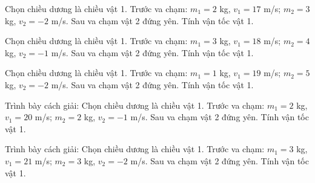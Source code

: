 \begin{ex}
Chọn chiều dương là chiều vật 1. Trước va chạm: $m_1=2$ kg, $v_1=17$ m/s; $m_2=3$ kg, $v_2=-2$ m/s. Sau va chạm vật 2 đứng yên. Tính vận tốc vật 1.
\end{ex}

\begin{ex}
Chọn chiều dương là chiều vật 1. Trước va chạm: $m_1=3$ kg, $v_1=18$ m/s; $m_2=4$ kg, $v_2=-1$ m/s. Sau va chạm vật 2 đứng yên. Tính vận tốc vật 1.
\end{ex}

\begin{ex}
Chọn chiều dương là chiều vật 1. Trước va chạm: $m_1=1$ kg, $v_1=19$ m/s; $m_2=5$ kg, $v_2=-2$ m/s. Sau va chạm vật 2 đứng yên. Tính vận tốc vật 1.
\end{ex}

\begin{bt}
Trình bày cách giải: Chọn chiều dương là chiều vật 1. Trước va chạm: $m_1=2$ kg, $v_1=20$ m/s; $m_2=2$ kg, $v_2=-1$ m/s. Sau va chạm vật 2 đứng yên. Tính vận tốc vật 1.
\end{bt}

\begin{bt}
Trình bày cách giải: Chọn chiều dương là chiều vật 1. Trước va chạm: $m_1=3$ kg, $v_1=21$ m/s; $m_2=3$ kg, $v_2=-2$ m/s. Sau va chạm vật 2 đứng yên. Tính vận tốc vật 1.
\end{bt}

